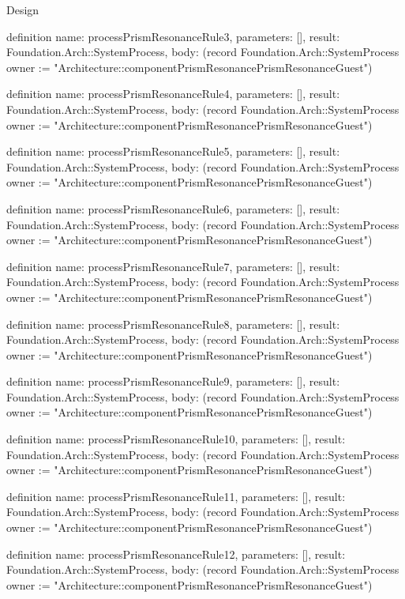 \begin{lexlean}{Design}
\begin{semanticmodule}
definition{
  name: processPrismResonanceRule3,
  parameters: [],
  result: Foundation.Arch::SystemProcess,
  body: (record Foundation.Arch::SystemProcess {owner := "Architecture::componentPrismResonancePrismResonanceGuest"})
}

definition{
  name: processPrismResonanceRule4,
  parameters: [],
  result: Foundation.Arch::SystemProcess,
  body: (record Foundation.Arch::SystemProcess {owner := "Architecture::componentPrismResonancePrismResonanceGuest"})
}

definition{
  name: processPrismResonanceRule5,
  parameters: [],
  result: Foundation.Arch::SystemProcess,
  body: (record Foundation.Arch::SystemProcess {owner := "Architecture::componentPrismResonancePrismResonanceGuest"})
}

definition{
  name: processPrismResonanceRule6,
  parameters: [],
  result: Foundation.Arch::SystemProcess,
  body: (record Foundation.Arch::SystemProcess {owner := "Architecture::componentPrismResonancePrismResonanceGuest"})
}

definition{
  name: processPrismResonanceRule7,
  parameters: [],
  result: Foundation.Arch::SystemProcess,
  body: (record Foundation.Arch::SystemProcess {owner := "Architecture::componentPrismResonancePrismResonanceGuest"})
}

definition{
  name: processPrismResonanceRule8,
  parameters: [],
  result: Foundation.Arch::SystemProcess,
  body: (record Foundation.Arch::SystemProcess {owner := "Architecture::componentPrismResonancePrismResonanceGuest"})
}

definition{
  name: processPrismResonanceRule9,
  parameters: [],
  result: Foundation.Arch::SystemProcess,
  body: (record Foundation.Arch::SystemProcess {owner := "Architecture::componentPrismResonancePrismResonanceGuest"})
}

definition{
  name: processPrismResonanceRule10,
  parameters: [],
  result: Foundation.Arch::SystemProcess,
  body: (record Foundation.Arch::SystemProcess {owner := "Architecture::componentPrismResonancePrismResonanceGuest"})
}

definition{
  name: processPrismResonanceRule11,
  parameters: [],
  result: Foundation.Arch::SystemProcess,
  body: (record Foundation.Arch::SystemProcess {owner := "Architecture::componentPrismResonancePrismResonanceGuest"})
}

definition{
  name: processPrismResonanceRule12,
  parameters: [],
  result: Foundation.Arch::SystemProcess,
  body: (record Foundation.Arch::SystemProcess {owner := "Architecture::componentPrismResonancePrismResonanceGuest"})
}


\end{semanticmodule}
\end{lexlean}
